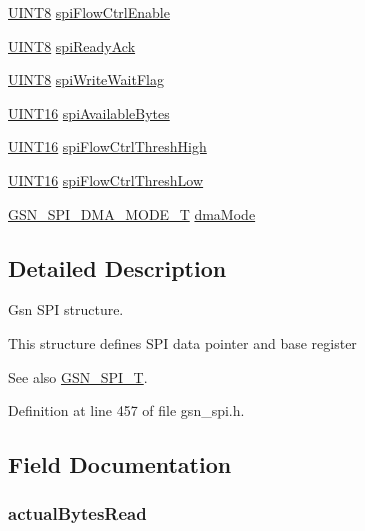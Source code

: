 \begin{DoxyCompactItemize}
\item 
\hyperlink{a00660_gab27e9918b538ce9d8ca692479b375b6a}{UINT8} \hyperlink{a00230_a1bc4a98bab8dbbd5b534535948c82885}{spiFlowCtrlEnable}
\item 
\hyperlink{a00660_gab27e9918b538ce9d8ca692479b375b6a}{UINT8} \hyperlink{a00230_a7d64b559bc60710f2a2399d32349f735}{spiReadyAck}
\item 
\hyperlink{a00660_gab27e9918b538ce9d8ca692479b375b6a}{UINT8} \hyperlink{a00230_aece15d1c03fade6b2bb0c58ae4d868c1}{spiWriteWaitFlag}
\item 
\hyperlink{a00660_ga09f1a1fb2293e33483cc8d44aefb1eb1}{UINT16} \hyperlink{a00230_aeb856d40bd458a2626a852d943ac6011}{spiAvailableBytes}
\item 
\hyperlink{a00660_ga09f1a1fb2293e33483cc8d44aefb1eb1}{UINT16} \hyperlink{a00230_a7a439375ec71a8ebe796fcf8730e7b25}{spiFlowCtrlThreshHigh}
\item 
\hyperlink{a00660_ga09f1a1fb2293e33483cc8d44aefb1eb1}{UINT16} \hyperlink{a00230_ab3786a410bf7727e7b2a8fc665b8166e}{spiFlowCtrlThreshLow}
\item 
\hyperlink{a00655_gafff743b26bbfafb380a9797457935a0e}{GSN\_\-SPI\_\-DMA\_\-MODE\_\-T} \hyperlink{a00230_a8745e343cad523631d63304871d0bdf3}{dmaMode}
\end{DoxyCompactItemize}


\subsection{Detailed Description}
Gsn SPI structure. 

This structure defines SPI data pointer and base register

\begin{DoxySeeAlso}{See also}
\hyperlink{a00655_ga18a5a1252fa65289699c9caa71d05fca}{GSN\_\-SPI\_\-T}. 
\end{DoxySeeAlso}


Definition at line 457 of file gsn\_\-spi.h.



\subsection{Field Documentation}
\hypertarget{a00230_aa458a81c4cc5863c64abf7dac4d6a497}{
\subsubsection[{actualBytesRead}]{ {\bf actualBytesRead}}}
\label{a00230_aa458a81c4cc5863c64abf7dac4d6a497}



